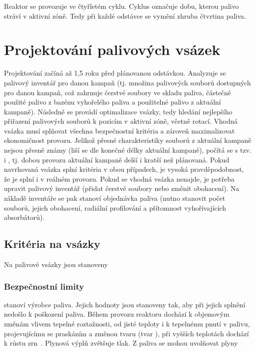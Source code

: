 Reaktor se provozuje ve čtyřletém cyklu. Cyklus označuje dobu, kterou palivo stráví v aktivní zóně. Tedy při každé odstávce se vymění zhruba 
čtvrtina paliva. 

\section{Projektování palivových vsázek}
Projektování začíná až 1,5 roku před plánovanou odstávkou. Analyzuje se palivový inventář pro danou kampaň (tj. množina palivových souborů dostupných pro 
danou kampaň, což zahrnuje čerstvé soubory ve skladu paliva, částečně použité palivo z bazénu vyhořelého paliva a použitelné palivo z aktuální 
kampaně). Následně se provádí optimalizace vsázky, tedy hledání nejlepšího přiřazení palivových souborů k pozicím v aktivní zóně, včetně rotací. 
Vhodná vsázka musí splňovat všechna bezpečnostní kritéria a zároveň maximalizovat ekonomičnost provozu. Jelikož přesné charakteristiky 
souborů z aktuální kampaně nejsou přesně známy (liší se dle konečné délky aktuální kampaně), počítá se s tzv.  i , tj. 
dobou provozu aktuální kampaně delší i kratší než plánovaná. Pokud navrhovaná vsázka splní kritéria v obou případech, je vysoká pravděpodobnost, že 
je splní i v reálném provozu. Pokud se vhodná vsázka nenajde, je potřeba upravit palivový inventář (přidat čerstvé soubory nebo změnit obohacení). 
Na základě inventáře se pak stanoví objednávka paliva (nutno stanovit počet souborů, jejich obohacení, radiální profilování a přítomnost vyhořívajících 
absorbátorů). 

\subsection{Kritéria na vsázky}
\label{subsec:krit}
Na palivové vsázky jsou stanoveny

\subsubsection*{Bezpečnostní limity} stanoví výrobce paliva. Jejich hodnoty jsou stanoveny tak, aby při jejich splnění nedošlo k poškození paliva. 
Během provozu reaktoru dochází k objemovým změnám vlivem tepelné roztažnosti, od jisté teploty i k tepelnému pnutí v palivu, projevujícímu se praskáním a 
změnou tvaru (tvar ), při vyšších teplotách dochází k růstu zrn~\cite{burket_dp}. Plynová výplň zvětšuje tlak. Z paliva se mohou 
uvolňovat plyny  


